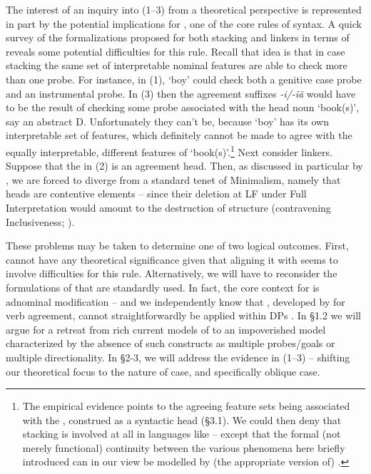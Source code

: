 \documentclass[output=paper]{langsci/langscibook}
\begin{document}
The interest of an inquiry into (1--3) from a theoretical perspective is represented in part by the potential implications for , one of the core rules of  syntax. A quick survey of the formalizations proposed for both stacking and linkers in terms of  reveals some potential difficulties for this rule. Recall that  idea is that in case stacking the same set of interpretable nominal features are able to check more than one probe. For instance, in (1), ‘boy’ could check both a genitive case probe and an instrumental probe. In (3) then the agreement suffixes \textit{{}-}\textit{i/-ĩã} would have to be the result of checking some probe associated with the head noun ‘book(s)’, say an abstract D. Unfortunately they can’t be, because ‘boy’ has its own interpretable set of features, which definitely cannot be made to agree with the equally interpretable, different features of ‘book(s)’.\footnote{The empirical evidence points to the agreeing feature sets being associated with the , construed as a syntactic head (§3.1). We could then deny that stacking is involved at all in languages like  – except that the formal (not merely functional) continuity between the various phenomena here briefly introduced can in our view be modelled by (the appropriate version of) .} Next consider linkers. Suppose that the   in (2) is an agreement head. Then, as discussed in particular by \citet{Philip2012}, we are forced to diverge from a standard tenet of Minimalism, namely that heads are contentive elements – since their deletion at LF under Full Interpretation would amount to the destruction of structure (contravening Inclusiveness; \citealt{Chomsky1995}). 

These problems may be taken to determine one of two logical outcomes. First,  cannot have any theoretical significance given that aligning it with  seems to involve difficulties for this rule. Alternatively, we will have to reconsider the formulations of  that are standardly used. In fact, the core context for  is adnominal modification – and we independently know that  , developed by \citet{Chomsky2000,Chomsky2001Derivation} for verb agreement, cannot straightforwardly be applied within DPs \citep{Carstens2001}. In §1.2 we will argue for a retreat from rich current models of  to an impoverished model characterized by the absence of such constructs as multiple probes\slash goals or multiple directionality. In §2-3, we will address the evidence in (1--3) – shifting our theoretical focus to the nature of case, and specifically oblique case.
\end{document}
